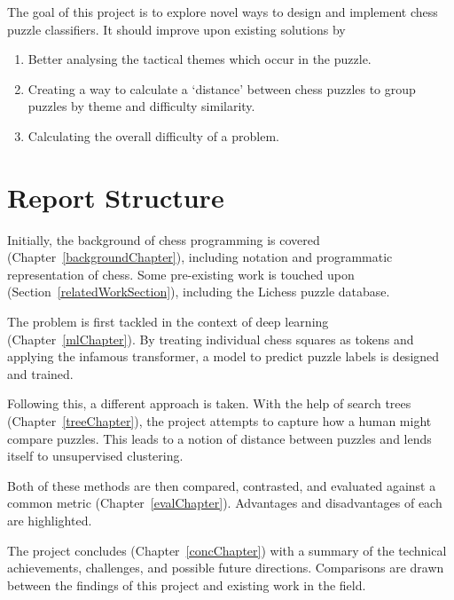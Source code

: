 The goal of this project is to explore novel ways to design and implement chess
puzzle classifiers. It should improve upon existing solutions by

\begin{enumerate}
    \item Better analysing the tactical themes which occur in the puzzle.
    \item Creating a way to calculate a `distance' between chess puzzles to 
    group puzzles by theme and difficulty similarity.
    \item Calculating the overall difficulty of a problem.
\end{enumerate}

\section{Report Structure}

Initially, the background of chess programming is covered
(Chapter~\ref{backgroundChapter}), including notation and programmatic
representation of chess. Some pre-existing work is touched upon
(Section~\ref{relatedWorkSection}), including the Lichess puzzle database.

The problem is first tackled in the context of deep learning
(Chapter~\ref{mlChapter}). By treating individual chess squares as tokens and
applying the infamous transformer, a model to predict puzzle labels is designed
and trained.

Following this, a different approach is taken. With the help of search trees
(Chapter~\ref{treeChapter}), the project attempts to capture how a human might
compare puzzles. This leads to a notion of distance between puzzles and lends
itself to unsupervised clustering.

Both of these methods are then compared, contrasted, and evaluated against a
common metric (Chapter~\ref{evalChapter}). Advantages and disadvantages of each
are highlighted.

The project concludes (Chapter~\ref{concChapter}) with a summary of the
technical achievements, challenges, and possible future directions. Comparisons
are drawn between the findings of this project and existing work in the field.
